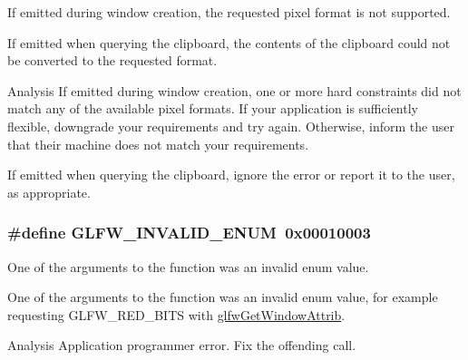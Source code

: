 If emitted during window creation, the requested pixel format is not supported.

If emitted when querying the clipboard, the contents of the clipboard could not be converted to the requested format.

\begin{DoxyParagraph}{Analysis}
If emitted during window creation, one or more hard constraints did not match any of the available pixel formats. If your application is sufficiently flexible, downgrade your requirements and try again. Otherwise, inform the user that their machine does not match your requirements.
\end{DoxyParagraph}
\begin{DoxyParagraph}{}
If emitted when querying the clipboard, ignore the error or report it to the user, as appropriate. 
\end{DoxyParagraph}
\hypertarget{group__errors_ga76f6bb9c4eea73db675f096b404593ce}{}
\subsubsection[{G\+L\+F\+W\+\_\+\+I\+N\+V\+A\+L\+I\+D\+\_\+\+E\+N\+U\+M}]{\setlength{\rightskip}{0pt plus 5cm}\#define G\+L\+F\+W\+\_\+\+I\+N\+V\+A\+L\+I\+D\+\_\+\+E\+N\+U\+M~0x00010003}\label{group__errors_ga76f6bb9c4eea73db675f096b404593ce}


One of the arguments to the function was an invalid enum value. 

One of the arguments to the function was an invalid enum value, for example requesting G\+L\+F\+W\+\_\+\+R\+E\+D\+\_\+\+B\+I\+T\+S with \hyperlink{group__window_ga1bb0c7e100418e284dbb800789c63d40}{glfw\+Get\+Window\+Attrib}.

\begin{DoxyParagraph}{Analysis}
Application programmer error. Fix the offending call. 
\end{DoxyParagraph}
\hypertarget{group__errors_gaaf2ef9aa8202c2b82ac2d921e554c687}{}
